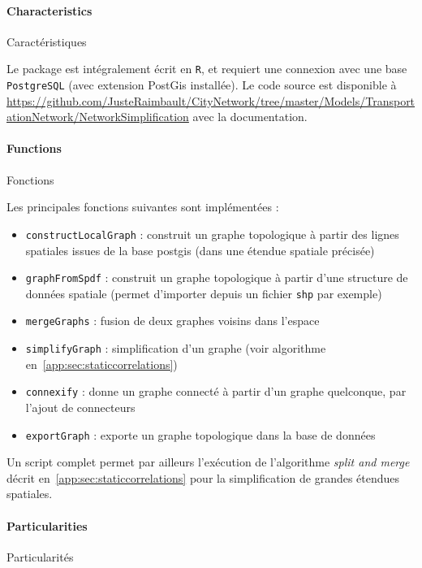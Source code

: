 \paragraph{Characteristics}{Caractéristiques}


Le package est intégralement écrit en \texttt{R}, et requiert une connexion avec une base \texttt{PostgreSQL} (avec extension PostGis installée). Le code source est disponible à \url{https://github.com/JusteRaimbault/CityNetwork/tree/master/Models/TransportationNetwork/NetworkSimplification} avec la documentation.

\paragraph{Functions}{Fonctions}

Les principales fonctions suivantes sont implémentées :
\begin{itemize}
	\item \texttt{constructLocalGraph} : construit un graphe topologique à partir des lignes spatiales issues de la base postgis (dans une étendue spatiale précisée)
	\item \texttt{graphFromSpdf} : construit un graphe topologique à partir d'une structure de données spatiale (permet d'importer depuis un fichier \texttt{shp} par exemple)
	\item \texttt{mergeGraphs} : fusion de deux graphes voisins dans l'espace
	\item \texttt{simplifyGraph} : simplification d'un graphe (voir algorithme en~\ref{app:sec:staticcorrelations})
	\item \texttt{connexify} : donne un graphe connecté à partir d'un graphe quelconque, par l'ajout de connecteurs
	\item \texttt{exportGraph} : exporte un graphe topologique dans la base de données
\end{itemize}

Un script complet permet par ailleurs l'exécution de l'algorithme \emph{split and merge} décrit en~\ref{app:sec:staticcorrelations} pour la simplification de grandes étendues spatiales.


\paragraph{Particularities}{Particularités}

